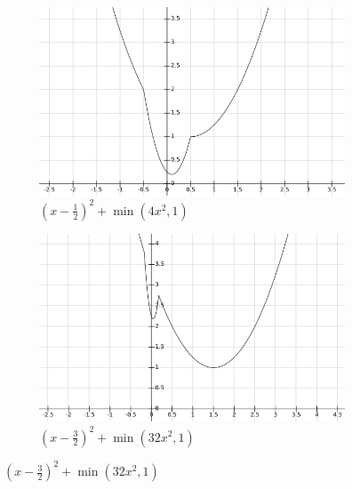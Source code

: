\documentclass{scrreprt}
\begin{document}
            \begin{figure}[!ht]
                    \centering
                    \begin{subfigure}[b]{0.49\textwidth}
                        \begin{framed}
                            \includegraphics[width=\textwidth]{img/f_1.png}
                            \caption{$(x-\frac{1}{2})^{2} + \min(4x^{2}, 1)$}
                        \end{framed}
                    \end{subfigure}
                    \begin{subfigure}[b]{0.49\textwidth}
                        \begin{framed}
                            \includegraphics[width=\textwidth]{img/f_2.png}
                            \caption{$(x-\frac{3}{2})^{2} + \min(32x^{2}, 1)$}
                        \end{framed}

\end{subfigure}
\end{figure}
\end{document}
